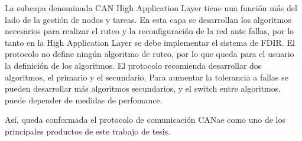 La subcapa denominada CAN High Application Layer tiene una función más del lado de la gestión de nodos y tareas.
En esta capa se desarrollan los algoritmos necesarios para realizar el ruteo y la reconfiguración de la red ante
fallas, por lo tanto en la High Application Layer se debe implementar el sistema de FDIR. El protocolo no define ningún
algoritmo de ruteo, por lo que queda para el usuario la definición de los algoritmos.
El protocolo  recomienda desarrollar dos algoritmos, el primario y el secundario.
Para aumentar la tolerancia a fallas se pueden desarrollar más algoritmos
secundarios, y el switch entre algoritmos, puede depender de medidas de perfomance.

Así, queda conformada el protocolo de comunicación CANae como uno de los
principales productos de este trabajo de tesis. 
